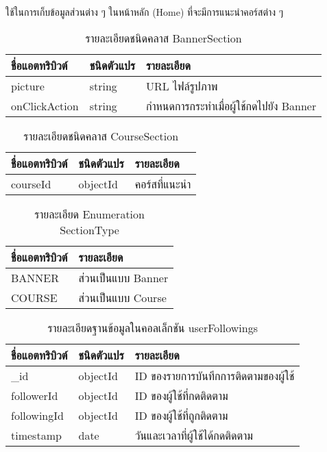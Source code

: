 \begin{table}
    \caption{รายละเอียดชนิดคลาส BannerSection}
    \noindent ใช้ในการเก็บข้อมูลส่วนต่าง ๆ ในหน้าหลัก (Home) ที่จะมีการแนะนำคอร์สต่าง ๆ
    \begin{tabularx}{\textwidth}{ | l | l | X | }
        \hline
        \bf ชื่อแอตทริบิวต์ & \bf ชนิดตัวแปร & \bf รายละเอียด \\\hline
        picture & string & URL ไฟล์รูปภาพ\\\hline
        onClickAction & string & กำหนดการกระทำเมื่อผู้ใช้กดไปยัง Banner\\\hline
    \end{tabularx}
\end{table}

\begin{table}
    \caption{รายละเอียดชนิดคลาส CourseSection}
    \begin{tabularx}{\textwidth}{ | l | l | X | }
        \hline
        \bf ชื่อแอตทริบิวต์ & \bf ชนิดตัวแปร & \bf รายละเอียด \\\hline
        courseId & objectId & คอร์สที่แนะนำ\\\hline
    \end{tabularx}
\end{table}

\begin{table}
    \caption{รายละเอียด Enumeration SectionType}
    \begin{tabularx}{\textwidth}{ | l | X | }
        \hline
        \bf ชื่อแอตทริบิวต์ & \bf รายละเอียด \\\hline
        BANNER & ส่วนเป็นแบบ Banner\\\hline
        COURSE & ส่วนเป็นแบบ Course\\\hline
    \end{tabularx}
\end{table}

\begin{table}
    \caption{รายละเอียดฐานข้อมูลในคอลเล็กชัน userFollowings}
    \begin{tabularx}{\textwidth}{ | l | l | X | }
        \hline
        \bf ชื่อแอตทริบิวต์ & \bf ชนิดตัวแปร & \bf รายละเอียด \\\hline
        \_id & objectId & ID ของรายการบันทึกการติดตามของผู้ใช้\\\hline
        followerId & objectId & ID ของผู้ใช้ที่กดติดตาม\\\hline
        followingId & objectId & ID ของผู้ใช้ที่ถูกติดตาม\\\hline
        timestamp & date & วันและเวลาที่ผู้ใช้ได้กดติดตาม\\\hline
    \end{tabularx}
\end{table}

